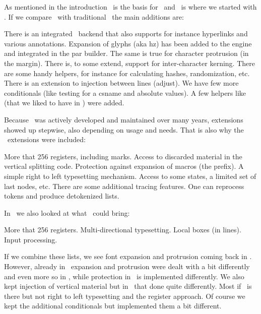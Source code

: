 As mentioned in the introduction \PDFTEX\ is the basis for \LUATEX\ and \LUATEX\ is
where we started with \LUAMETATEX. If we compare \PDFTEX\ with traditional \TEX\
the main additions are:

\startitemize[packed]
\startitem
    There is an integrated \PDF\ backend that also supports for instance
    hyperlinks and various annotations.
\stopitem
\startitem
    Expansion of glyphs (aka hz) has been added to the engine and integrated in
    the par builder. The same is true for character protrusion (in the margin).
\stopitem
\startitem
    There is, to some extend, support for inter-character kerning.
\stopitem
\startitem
    There are some handy helpers, for instance for calculating hashes,
    randomization, etc.
\stopitem
\startitem
    There is an extension to injection between lines (adjust).
\stopitem
\startitem
    We have few more conditionals (like testing for a csname and absolute values).
\stopitem
\startitem
    A few helpers like \type {\quitvmode} (that we liked to have in \CONTEXT)
    were added.
\stopitem
\stopitemize

Because \PDFTEX\ was actively developed and maintained over many years,
extensions showed up stepwise, also depending on usage and needs. That is also
why the \ETEX\ extensions were included:

\startitemize[packed]
\startitem
    More that 256 registers, including marks.
\stopitem
\startitem
    Access to discarded material in the vertical splitting code.
\stopitem
\startitem
    Protection against expansion of macros (the \type {\protected} prefix).
\stopitem
\startitem
    A simple right to left typesetting mechanism.
\stopitem
\startitem
    Access to some states, a limited set of last nodes, etc.
\stopitem
\startitem
    There are some additional tracing features.
\stopitem
\startitem
    One can reprocess tokens and produce detokenized lists.
\stopitem
\stopitemize

In \LUATEX\ we also looked at what \OMEGA\ could bring:

\startitemize[packed]
\startitem
    More that 256 registers.
\stopitem
\startitem
    Multi-directional typesetting.
\stopitem
\startitem
    Local boxes (in lines).
\stopitem
\startitem
    Input processing.
\stopitem
\stopitemize

If we combine these lists, we see font expansion and protrusion coming back in
\LUAMETATEX. However, already in \LUATEX\ expansion and protrusion were dealt
with a bit differently and even more so in \LUAMETATEX, while protection in
\LUAMETATEX\ is implemented differently. We also kept injection of vertical
material but in \LUAMETATEX\ that done quite differently. Most if \ETEX\ is there
but not right to left typesetting and the register approach. Of course we kept
the additional conditionals but implemented them a bit different.

